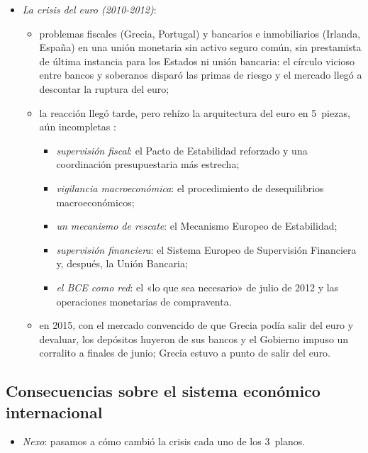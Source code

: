 \documentclass[11pt]{article}
\begin{document}
\begin{itemize}
\begin{itemize}
  \end{itemize}
\item \emph{La crisis del euro (2010-2012)}:
  \begin{itemize}
  \item problemas fiscales (Grecia, Portugal) y bancarios e inmobiliarios (Irlanda, España) en una unión monetaria sin activo seguro común, sin prestamista de última instancia para los Estados ni unión bancaria: el círculo vicioso entre bancos y soberanos disparó las primas de riesgo y el mercado llegó a descontar la ruptura del euro;
  \item la reacción llegó tarde, pero rehízo la arquitectura del euro en 5~piezas, aún incompletas   :
    \begin{itemize}
    \item \emph{supervisión fiscal}: el Pacto de Estabilidad reforzado y una coordinación presupuestaria más estrecha;
    \item \emph{vigilancia macroeconómica}: el procedimiento de desequilibrios macroeconómicos;
    \item \emph{un mecanismo de rescate}: el Mecanismo Europeo de Estabilidad;
    \item \emph{supervisión financiera}: el Sistema Europeo de Supervisión Financiera y, después, la Unión Bancaria;
    \item \emph{el BCE como red}: el «lo que sea necesario» de julio de 2012 y las operaciones monetarias de compraventa.
    \end{itemize}
  \item en 2015, con el mercado convencido de que Grecia podía salir del euro y devaluar, los depósitos huyeron de sus bancos y el Gobierno impuso un corralito a finales de junio; Grecia estuvo a punto de salir del euro.
  \end{itemize}
\end{itemize}

\subsection{Consecuencias sobre el sistema económico internacional}\label{sec:consecuencias}

\begin{itemize}
\item \emph{Nexo}: pasamos a cómo cambió la crisis cada uno de los 3~planos.
\end{itemize}
\end{document}
